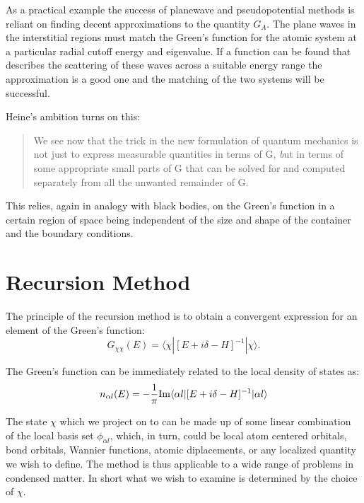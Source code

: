 \documentclass{article}
\def\ket{\rangle}
\def\bra{\langle}
\begin{document}
As a practical example the success of planewave and pseudopotential methods 
is reliant on finding decent approximations to the quantity $G_{A}$. The plane waves
in the interstitial regions must match the Green's function for the atomic system
at a particular radial cutoff energy and eigenvalue. If a function can be found that 
describes the scattering of these waves across a suitable energy range the approximation 
is a good one and the matching of the two systems will be successful.

Heine's ambition turns on this:
%
\begin{quote}
We see now that the trick in the new formulation of quantum 
mechanics is not just to express measurable quantities in terms of 
G, {\emph but in terms of some appropriate small parts of G that can be solved 
for and computed separately from all the unwanted remainder of G.}
\end{quote}
%
This relies, again in analogy with black bodies, on the Green's
function in a certain region of space being independent of the size and shape
of the container and the boundary conditions.

\section{Recursion Method}
  The principle of the recursion method is to obtain a convergent expression 
for an element of the Green's function:
%
\begin{equation}
G_{\chi\chi}(E) = \bra\chi|[E + i\delta -H]^{-1}|\chi\ket.
\end{equation}
%

The Green's function can be immediately related to the local density of states as:
%
\begin{equation}
n_{\alpha l}(E) = -\frac{1}{\pi} {\rm Im}\bra\alpha l|[E + i\delta -H]^{-1}|\alpha l\ket
\end{equation}
%

The state $\chi$ which we project on to can be made up of some linear combination 
of the local basis set $\phi_{\alpha l}$, which, in turn, could be local atom centered orbitals, bond orbitals, 
Wannier functions, atomic diplacements, or any localized quantity we wish to define. The method is thus
applicable to a wide range of problems in condensed matter. In short what we wish to examine
is determined by the choice of $\chi$.
\end{document}
